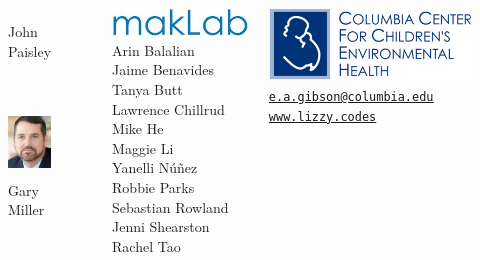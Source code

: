 \documentclass{beamer}
\begin{document}
{\begin{columns}
\begin{figure}
\begin{minipage}[t]{0.45\textwidth}
		\caption{John Paisley}
	\end{minipage} \\
	\vspace{5pt}
	\begin{minipage}[t]{1\textwidth}
		\centering\includegraphics[height=0.7in]{figures/headshots/gary.jpg}  
		\caption{Gary Miller}
	\end{minipage}
\end{figure}


\begin{flushright}
\includegraphics[scale=0.35]{figures/makLab_logo.jpg} \\ 
\vspace{1mm}
\scriptsize
Arin Balalian \\
Jaime Benavides \\
Tanya Butt \\
Lawrence Chillrud \\
Mike He \\
Maggie Li \\
Yanelli N\'{u}\~{n}ez \\
Robbie Parks \\
Sebastian Rowland \\
Jenni Shearston \\
Rachel Tao \\
\end{flushright}

\vspace{-2em}

\begin{center}
\includegraphics[scale=0.25]{figures/ccceh_logo.jpg} \\
\vspace{1ex}
\tiny
\href{mailto:e.a.gibson@columbia.edu}{\faEnvelopeO \hspace{0.25ex} \tt e.a.gibson@columbia.edu} \\
\href{http://www.lizzy.codes}{\faGlobe \hspace{0.5ex} \tt www.lizzy.codes}
\end{center}


\end{columns}}
\end{document}
